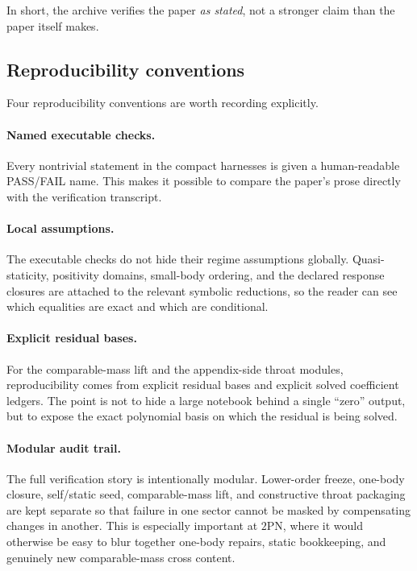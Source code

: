 \documentclass[11pt]{article}
\newcommand{\TwoPN}{\mathrm{2PN}}
\begin{document}
In short, the archive verifies the paper \emph{as stated}, not a stronger claim than the
paper itself makes.

\subsection{Reproducibility conventions}
\label{sec:verification-conventions}

Four reproducibility conventions are worth recording explicitly.

\paragraph{Named executable checks.}
Every nontrivial statement in the compact harnesses is given a human-readable PASS/FAIL
name.  This makes it possible to compare the paper's prose directly with the verification
transcript.

\paragraph{Local assumptions.}
The executable checks do not hide their regime assumptions globally.
Quasi-staticity, positivity domains, small-body ordering, and the declared response
closures are attached to the relevant symbolic reductions, so the reader can see which
equalities are exact and which are conditional.

\paragraph{Explicit residual bases.}
For the comparable-mass lift and the appendix-side throat modules, reproducibility comes
from explicit residual bases and explicit solved coefficient ledgers.
The point is not to hide a large notebook behind a single ``zero'' output, but to expose
the exact polynomial basis on which the residual is being solved.

\paragraph{Modular audit trail.}
The full verification story is intentionally modular.
Lower-order freeze, one-body closure, self/static seed, comparable-mass lift, and
constructive throat packaging are kept separate so that failure in one sector cannot be
masked by compensating changes in another.
This is especially important at \(\TwoPN\), where it would otherwise be easy to blur
together one-body repairs, static bookkeeping, and genuinely new comparable-mass cross
content.
\end{document}
